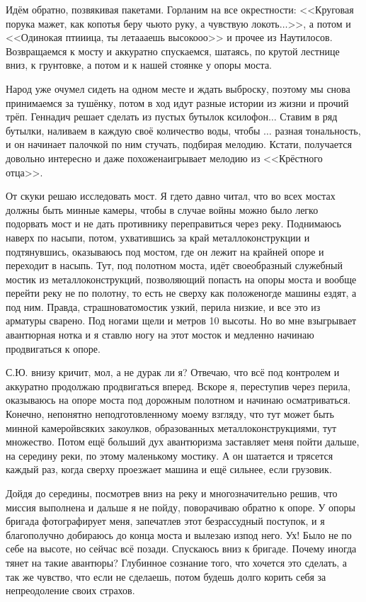 Идём обратно, позвякивая пакетами. Горланим на все окрестности: <<Круговая порука мажет, как копоть\mdash я беру чью\sdash то руку, а чувствую локоть$\ldots$>>, а потом и <<Одинокая пти\sdash и\sdash ица, ты лета\sdash а\sdash аешь высоко\sdash о\sdash о>> и прочее из Наутилосов. Возвращаемся к мосту и аккуратно спускаемся, шатаясь, по крутой лестнице вниз, к грунтовке, а потом и к нашей стоянке у опоры моста. 

Народ уже очумел сидеть на одном месте и ждать выброску, поэтому мы снова принимаемся за тушёнку, потом в ход идут разные истории из жизни и прочий трёп. Геннадич решает сделать из пустых бутылок ксилофон$\ldots$ Ставим в ряд бутылки, наливаем в каждую своё количество воды, чтобы $\ldots$ разная тональность, и он начинает палочкой по ним стучать, подбирая мелодию. Кстати, получается довольно интересно и даже похоже\mdash наигрывает мелодию из <<Крёстного отца>>. 

От скуки решаю исследовать мост. Я где\sdash то давно читал, что во всех мостах должны быть минные камеры, чтобы в случае войны можно было легко подорвать мост и не дать противнику переправиться через реку. Поднимаюсь наверх по насыпи, потом, ухватившись за край металлоконструкции и подтянувшись, оказываюсь под мостом, где он лежит на крайней опоре и переходит в насыпь. Тут, под полотном моста, идёт своеобразный служебный мостик из металлоконструкций, позволяющий попасть на опоры моста и вообще перейти реку не по полотну, то есть не сверху как положено\mdash где машины ездят, а под ним. Правда, страшновато\mdash мостик узкий, перила низкие, и все это из арматуры сварено. Под ногами щели и метров 10 высоты. Но во мне взыгрывает авантюрная нотка и я ставлю ногу на этот мосток и медленно начинаю продвигаться к опоре. 

С.Ю. внизу кричит, мол, а не дурак ли я? Отвечаю, что всё под контролем и аккуратно продолжаю продвигаться вперед. Вскоре я, переступив через перила, оказываюсь на опоре моста под дорожным полотном и начинаю осматриваться. Конечно, непонятно неподготовленному моему взгляду, что тут может быть минной камерой\mdash всяких закоулков, образованных металлоконструкциями, тут множество. Потом ещё больший дух авантюризма заставляет меня пойти дальше, на середину реки, по этому маленькому мостику. А он шатается и трясется каждый раз, когда сверху проезжает машина и ещё сильнее, если грузовик. 

Дойдя до середины, посмотрев вниз на реку и многозначительно решив, что миссия выполнена и дальше я не пойду, поворачиваю обратно к опоре. У опоры бригада фотографирует меня, запечатлев этот безрассудный поступок, и я благополучно добираюсь до конца моста и вылезаю из\sdash под него. Ух! Было не по себе на высоте, но сейчас всё позади. Спускаюсь вниз к бригаде. Почему иногда тянет на такие авантюры? Глубинное сознание того, что хочется это сделать, а так же чувство, что если не сделаешь, потом будешь долго корить себя за непреодоление своих страхов.

